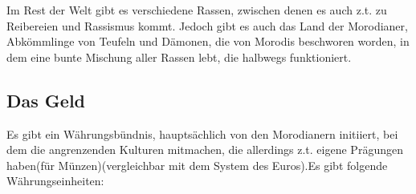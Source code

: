 Im Rest der Welt gibt es verschiedene Rassen, zwischen denen es auch z.t. zu Reibereien und Rassismus kommt. Jedoch gibt es auch das Land der Morodianer, Abkömmlinge von Teufeln und Dämonen, die von Morodis beschworen worden, in dem eine bunte Mischung aller Rassen lebt, die halbwegs funktioniert.

\begin{TODO}
\end{TODO}
\subsection{Das Geld}
Es gibt ein Währungsbündnis, hauptsächlich von den Morodianern initiiert, bei dem die angrenzenden Kulturen mitmachen, die allerdings z.t. eigene Prägungen haben(für Münzen)(vergleichbar mit dem System des Euros).Es gibt folgende Währungseinheiten:

